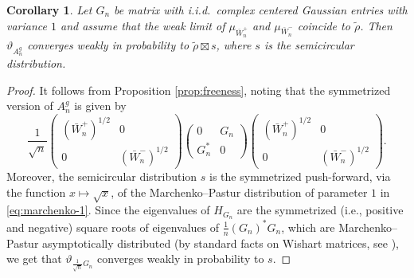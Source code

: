 \documentclass[11pt,oneside]{amsart}
\theoremstyle{plain}
\newtheorem{corollary}[theorem]{Corollary}
\numberwithin{equation}{section}
\newcommand{\iid}{{i.i.d.~}}
\newcommand{\esd}[1]{\mu_{#1}}
\begin{document}
\begin{corollary} \label{cor:freeness}
Let $G_n$ be matrix with \iid complex centered Gaussian entries with variance $1$ and assume that the weak limit of $\esd{\bar{W}_n^+}$ and $\esd{\bar{W}_n^-}$ coincide to $\tilde \rho$. Then $\vartheta_{{A}_n^g}$ converges weakly in probability to $\tilde \rho
    \boxtimes s$, where $s$ is the semicircular distribution.
\end{corollary}
\begin{proof}
    It follows from Proposition \ref{prop:freeness}, noting that the symmetrized version of 
    ${A}_n^g
    $ 
    is given by
    \begin{equation}
   \frac{1}{\sqrt{n}} \begin{pmatrix} (\bar{W}_n^+)^{1/2} & 0  \\ 0 & (\bar{W}_n^- )^{1/2} \end{pmatrix}
        \begin{pmatrix} 0 & G_n \\  G_n^*   & 0 \end{pmatrix}
        \begin{pmatrix} (\bar{W}_n^+)^{1/2} & 0  \\ 0 & (\bar{W}_n^- )^{1/2} \end{pmatrix}
        .
\end{equation}
Moreover, the semicircular distribution $s$ is the symmetrized push-forward, via the function $x \mapsto \sqrt{x}$, of the Marchenko--Pastur distribution of parameter $1$ in \eqref{eq:marchenko-1}.
Since the eigenvalues of $H_{G_n}$ are the symmetrized (i.e., positive and negative) square roots of eigenvalues of $\tfrac 1{n} (G_n)^*G_n$, which are Marchenko--Pastur asymptotically distributed (by standard facts on Wishart matrices, see \cite{mingo}), we get that $\vartheta_{\tfrac{1}{\sqrt{n}}G_n}$ converges weakly in probability to $s$.
\end{proof}
\end{document}
